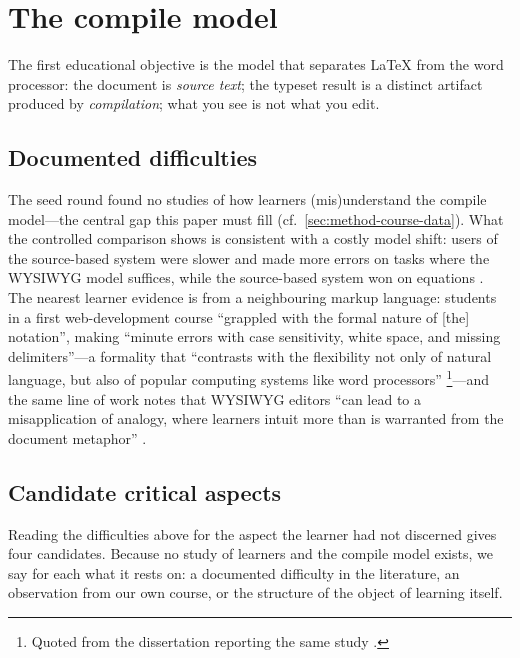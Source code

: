 \mode*
\section{The compile model}
\label{sec:compilation}

The first educational objective is the model that separates LaTeX from the
word processor: the document is \emph{source text}; the typeset result is
a distinct artifact produced by \emph{compilation}; what you see is not
what you edit.

\subsection{Documented difficulties}

The seed round found no studies of how learners (mis)understand the
compile model---the central gap this paper must fill (cf.\
\cref{sec:method-course-data}).
What the controlled comparison shows is consistent with a costly model
shift: users of the source-based system were slower and made more errors
on tasks where the WYSIWYG model suffices, while the source-based system
won on equations \autocite{Knauff2014Latex}.
The nearest learner evidence is from a neighbouring markup language:
students in a first web-development course \enquote{grappled with the
formal nature of [the] notation}, making \enquote{minute errors with case
sensitivity, white space, and missing delimiters}---a formality that
\enquote{contrasts with the flexibility not only of natural language, but
also of popular computing systems like word processors}
\autocite{Park2011WebDev}\footnote{Quoted from the dissertation reporting
the same study \autocite[p.~61]{Park2014openHTML}.}---and the same line of
work notes that WYSIWYG editors \enquote{can lead to a misapplication of
analogy, where learners intuit more than is warranted from the document
metaphor} \autocite[p.~38]{Park2014openHTML}.

\subsection{Candidate critical aspects}
\label{sec:compilation-aspects}

Reading the difficulties above for the aspect the learner had not
discerned gives four candidates.
Because no study of learners and the compile model exists, we say for
each what it rests on: a documented difficulty in the literature, an
observation from our own course, or the structure of the object of
learning itself.

